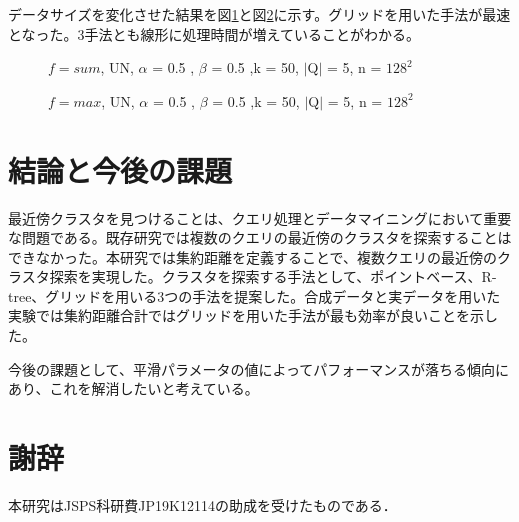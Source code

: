 \documentclass{deimj}
\begin{document}
データサイズを変化させた結果を図\ref{fig:sum-dataSize}と図\ref{fig:max-dataSize}に示す。グリッドを用いた手法が最速となった。3手法とも線形に処理時間が増えていることがわかる。

\begin{figure}[H]
	\centering
    \caption{$f=sum$, UN, $\alpha$ = 0.5 , $\beta$ = 0.5 ,k = 50, $\mid$Q$\mid$ = 5, n = $128^2$}
    \label{fig:sum-dataSize}
\end{figure}

\begin{figure}[H]
	\centering
    \caption{$f=max$, UN, $\alpha$ = 0.5 , $\beta$ = 0.5 ,k = 50, $\mid$Q$\mid$ = 5, n = $128^2$}
    \label{fig:max-dataSize}
\end{figure}

\section{結論と今後の課題}
最近傍クラスタを見つけることは、クエリ処理とデータマイニングにおいて重要な問題である。既存研究では複数のクエリの最近傍のクラスタを探索することはできなかった。本研究では集約距離を定義することで、複数クエリの最近傍のクラスタ探索を実現した。クラスタを探索する手法として、ポイントベース、R-tree、グリッドを用いる3つの手法を提案した。合成データと実データを用いた実験では集約距離合計ではグリッドを用いた手法が最も効率が良いことを示した。

今後の課題として、平滑パラメータの値によってパフォーマンスが落ちる傾向にあり、これを解消したいと考えている。

\section*{謝辞}
本研究はJSPS科研費JP19K12114の助成を受けたものである．

\vspace{2em}

\end{document}
